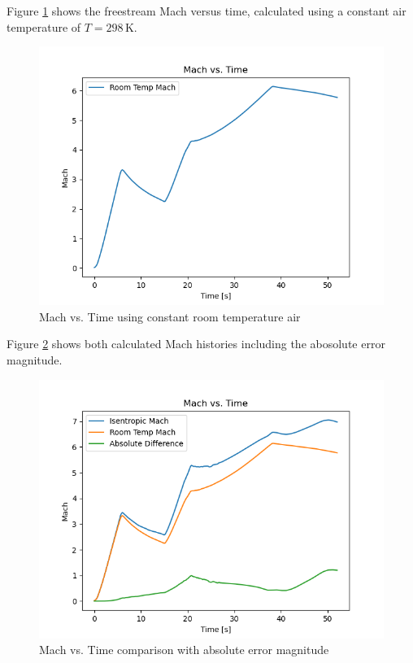 \documentclass[../main.tex]{subfiles}
\begin{document}
Figure \ref{Mach_298} shows the freestream Mach versus time, calculated using a constant air temperature of \(T=298\,\unit{\kelvin}\).

\begin{figure}[h]
    \centering
    \includegraphics[scale=.7]{../../images/problem_1/Mach_298_vs_Time.png}
    \caption{Mach vs. Time using constant room temperature air}
    \label{Mach_298}
\end{figure}

Figure \ref{Mach} shows both calculated Mach histories including the abosolute error magnitude.

\begin{figure}[h]
    \centering
    \includegraphics[scale=.7]{../../images/problem_1/Mach_vs_Time.png}
    \caption{Mach vs. Time comparison with absolute error magnitude}
    \label{Mach}
\end{figure}
\end{document}

